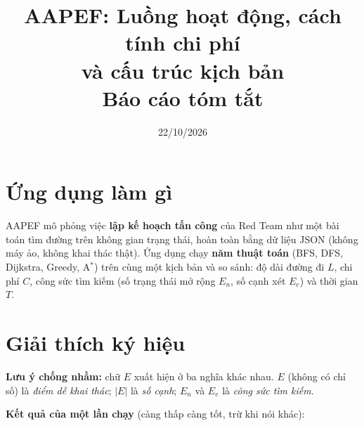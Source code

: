 \documentclass[11pt,a4paper]{article}
\title{\textbf{AAPEF: Luồng hoạt động, cách tính chi phí\\ và cấu trúc kịch bản}\\[2pt]
\large Báo cáo tóm tắt}
\author{}
\date{22/10/2026}
\newcommand{\E}{|E|}
\begin{document}
\maketitle
\vspace{-1.2cm}

\section{Ứng dụng làm gì}

AAPEF mô phỏng việc \textbf{lập kế hoạch tấn công} của Red Team như một bài toán tìm đường trên không gian trạng thái, hoàn toàn bằng dữ liệu JSON (không máy ảo, không khai thác thật). Ứng dụng chạy \textbf{năm thuật toán} (BFS, DFS, Dijkstra, Greedy, A$^{*}$) trên cùng một kịch bản và so sánh: độ dài đường đi $L$, chi phí $C$, công sức tìm kiếm (số trạng thái mở rộng $E_n$, số cạnh xét $E_e$) và thời gian $T$.

\section{Giải thích ký hiệu}
\label{sec:symbols}

\textbf{Lưu ý chống nhầm:} chữ $E$ xuất hiện ở ba nghĩa khác nhau. $E$ (không có chỉ số) là \emph{điểm dễ khai thác}; $\E$ là \emph{số cạnh}; $E_n$ và $E_e$ là \emph{công sức tìm kiếm}.

\textbf{Kết quả của một lần chạy} (càng thấp càng tốt, trừ khi nói khác):
\end{document}
